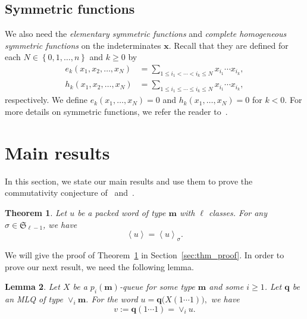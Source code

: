 \documentclass[reqno]{amsart}
\newcommand{\0}{\phantom{c}}
\newcommand{\swt}[1]{\left\langle #1 \right\rangle} %
\newcommand{\merge}[1]{\vee_{#1}} %
\newcommand{\SymGp}[1]{\mathfrak{S}_{#1}} %
\newcommand{\xx}{\mathbf{x}}
\newcommand{\mm}{\mathbf{m}}
\newcommand{\qq}{\mathbf{q}}
\let\sumnonlimits\sum
\renewcommand{\sum}{\sumnonlimits\limits}
\newcommand{\defn}[1]{{\color{darkred}\emph{#1}}} %
\theoremstyle{plain}
\newtheorem{thm}{Theorem}[section]
\newtheorem{lemma}[thm]{Lemma}
\theoremstyle{definition}
\numberwithin{equation}{section}
\begin{document}
\subsection{Symmetric functions}

We also need the \defn{elementary symmetric functions} and \defn{complete homogeneous symmetric functions} on the indeterminates $\xx$.
Recall that they are defined for each $N \in \left\{0,1,\ldots,n\right\}$ and $k \geq 0$ by
\begin{align*}
e_k(x_1, x_2, \dotsc, x_N) & = \sum_{1 \leq i_1 < \cdots < i_k \leq N} x_{i_1} \dotsm x_{i_k},
\\ h_k(x_1, x_2, \dotsc, x_N) & = \sum_{1 \leq i_1 \leq \cdots \leq i_k \leq N} x_{i_1} \dotsm x_{i_k},
\end{align*}
respectively.
We define $e_k(x_1, \dotsc, x_N) = 0$ and $h_k(x_1, \dotsc, x_N) = 0$ for $k < 0$.
For more details on symmetric functions, we refer the reader to~\cite[Ch.~7]{Stanley-EC2}.








\section{Main results}
\label{sec:result}


In this section, we state our main results and use them to prove the commutativity conjecture of~\cite{AAMP} and~\cite[Conj.~3.10]{AasLin17}.

\begin{thm}
\label{thm:permutation}
  Let $u$ be a packed word of type $\mm$ with $\ell$ classes.
  For any $\sigma \in \SymGp{\ell-1}$, we have 
  \[
  \swt{u} = \swt{u}_{\sigma}.
  \]
\end{thm}

We will give the proof of Theorem~\ref{thm:permutation} in Section~\ref{sec:thm_proof}.
In order to prove our next result, we need the following lemma.

\begin{lemma}
\label{lemma:queue_merge}
  Let $X$ be a $p_i(\mm)$-queue for some type $\mm$ and some $i \geq 1$.
  Let $\qq$ be an MLQ of type $\merge{i}\mm$.
  For the word
  $
  u = \qq\bigl( X(1 \dotsm 1) \bigr),
  $
  we have
  \[
  v := \qq(1 \dotsm 1) = \merge{i} u.
  \]
\end{lemma}
\end{document}
